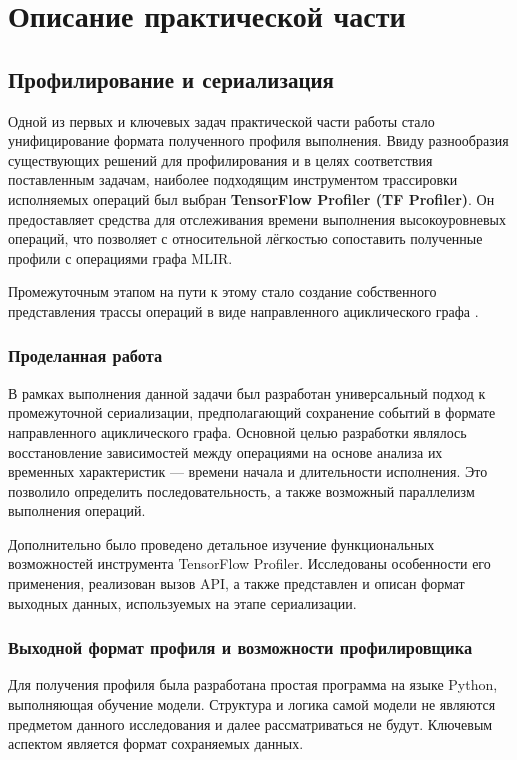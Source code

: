 \section{Описание практической части}
\label{sec:Chapter3} 

\subsection{Профилирование и сериализация}

Одной из первых и ключевых задач практической части работы стало унифицирование формата полученного профиля выполнения.
Ввиду разнообразия существующих решений для профилирования и в целях соответствия поставленным задачам, наиболее подходящим инструментом трассировки исполняемых операций был выбран \textbf{TensorFlow Profiler (TF Profiler)}.
Он предоставляет средства для отслеживания времени выполнения высокоуровневых операций, что позволяет с относительной лёгкостью сопоставить полученные профили с операциями графа MLIR.

Промежуточным этапом на пути к этому стало создание собственного представления трассы операций в виде направленного ациклического графа .

\subsubsection{Проделанная работа}
В рамках выполнения данной задачи был разработан универсальный подход к промежуточной сериализации, предполагающий сохранение событий в формате направленного ациклического графа.
Основной целью разработки являлось восстановление зависимостей между операциями на основе анализа их временных характеристик — времени начала и длительности исполнения.
Это позволило определить последовательность, а также возможный параллелизм выполнения операций.

Дополнительно было проведено детальное изучение функциональных возможностей инструмента TensorFlow Profiler.
Исследованы особенности его применения, реализован вызов API, а также представлен и описан формат выходных данных, используемых на этапе сериализации.

\subsubsection{Выходной формат профиля и возможности профилировщика}

Для получения профиля была разработана простая программа на языке Python, выполняющая обучение модели.
Структура и логика самой модели не являются предметом данного исследования и далее рассматриваться не будут.
Ключевым аспектом является формат сохраняемых данных.

